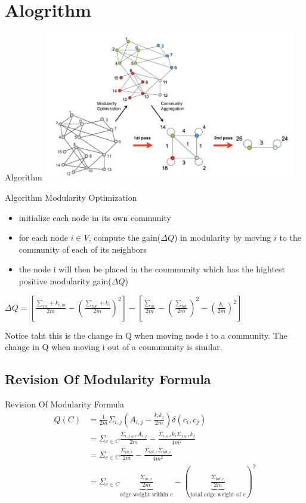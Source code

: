 \documentclass[12pt]{beamer}
\begin{document}
\section{Alogrithm}
\begin{frame}{Algorithm}
\centering
\includegraphics[width=11cm]{img/img3.png}
\end{frame}


\begin{frame}{Algorithm}
Modularity Optimization
\begin{itemize}
    \item initialize each node in its own community
    \item for each node $i \in V$, compute the gain($\Delta Q$) in modularity by moving $i$ to the community of each of its neighbors
    \item the node i will then be placed in the coummunity which has the hightest
        positive modularity gain($\Delta Q$)
\end{itemize}

$\Delta Q = \left[ \frac{\sum_{in} + k_{i,in}}{2m} - \left( \frac{\sum_{tot} + k_i}{2m} \right)^2 \right] - \left[ \frac{\sum_{in}}{2m} - \left( \frac{\sum_{tot}}{2m} \right)^2 - \left( \frac{k_i}{2m} \right)^2 \right]$
\vspace{0.3cm}

Notice taht this is the change in Q when moving node i to a community. The
change in Q when moving i out of a coummunity is similar.
\end{frame}


\subsection{Revision Of Modularity Formula}
\begin{frame}{Revision Of Modularity Formula}
\begin{align*}
Q(C)
    &= \frac{1}{2m}\Sigma_{i, j} (A_{i, j} - \frac{k_ik_j}{2m})\delta(c_i, c_j) \\
    &= \Sigma_{c\in C}\frac{\Sigma_{i, j\in c}A_{i, j}}{2m} - \frac{\Sigma_{i\in c}k_i\Sigma_{j\in c}k_j}{4m^2} \\
    &= \Sigma_{c\in C} \frac{\Sigma_{in,  c}}{2m} - \frac{\Sigma_{tot, c}\Sigma_{tot, c}}{4m^2} \\
    &= \Sigma_{c\in C} \underbrace{\frac{\Sigma_{in, c}}{2m}}_{\text{edge weight within $c$}}
        - ( \underbrace{\frac{\Sigma_{tot, c}}{2m}}_{\text{total edge weight of $c$}})^2
\end{align*}
\end{frame}
\end{document}
